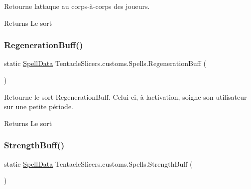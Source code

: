 Retourne l\textquotesingle{}attaque au corps-\/à-\/corps des joueurs. 

\begin{DoxyReturn}{Returns}
Le sort 
\end{DoxyReturn}
\mbox{\label{class_tentacle_slicers_1_1customs_1_1_spells_a85c4c7a4dd8b935f2f1f412d4f809c22}} 
\subsubsection{\texorpdfstring{Regeneration\+Buff()}{RegenerationBuff()}}
{\footnotesize\ttfamily static \hyperlink{class_tentacle_slicers_1_1spells_1_1_spell_data}{Spell\+Data} Tentacle\+Slicers.\+customs.\+Spells.\+Regeneration\+Buff (\begin{DoxyParamCaption}{ }\end{DoxyParamCaption})\hspace{0.3cm}{\ttfamily [static]}}



Retourne le sort Regeneration\+Buff. Celui-\/ci, à l\textquotesingle{}activation, soigne son utilisateur sur une petite période. 

\begin{DoxyReturn}{Returns}
Le sort 
\end{DoxyReturn}
\mbox{\label{class_tentacle_slicers_1_1customs_1_1_spells_a69a71ba970111827a09e04e8b40b48d5}} 
\subsubsection{\texorpdfstring{Strength\+Buff()}{StrengthBuff()}}
{\footnotesize\ttfamily static \hyperlink{class_tentacle_slicers_1_1spells_1_1_spell_data}{Spell\+Data} Tentacle\+Slicers.\+customs.\+Spells.\+Strength\+Buff (\begin{DoxyParamCaption}{ }\end{DoxyParamCaption})\hspace{0.3cm}{\ttfamily [static]}}



